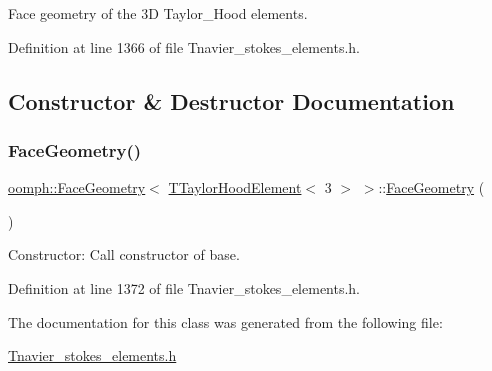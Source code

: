Face geometry of the 3D Taylor\+\_\+\+Hood elements. 

Definition at line 1366 of file Tnavier\+\_\+stokes\+\_\+elements.\+h.



\subsection{Constructor \& Destructor Documentation}
\mbox{\label{classoomph_1_1FaceGeometry_3_01TTaylorHoodElement_3_013_01_4_01_4_a4cb78d484cdadaaf55ca5a0fc8d3815b}} 
\subsubsection{\texorpdfstring{Face\+Geometry()}{FaceGeometry()}}
{\footnotesize\ttfamily \hyperlink{classoomph_1_1FaceGeometry}{oomph\+::\+Face\+Geometry}$<$ \hyperlink{classoomph_1_1TTaylorHoodElement}{T\+Taylor\+Hood\+Element}$<$ 3 $>$ $>$\+::\hyperlink{classoomph_1_1FaceGeometry}{Face\+Geometry} (\begin{DoxyParamCaption}{ }\end{DoxyParamCaption})\hspace{0.3cm}{\ttfamily [inline]}}



Constructor\+: Call constructor of base. 



Definition at line 1372 of file Tnavier\+\_\+stokes\+\_\+elements.\+h.



The documentation for this class was generated from the following file\+:\begin{DoxyCompactItemize}
\item 
\hyperlink{Tnavier__stokes__elements_8h}{Tnavier\+\_\+stokes\+\_\+elements.\+h}\end{DoxyCompactItemize}
